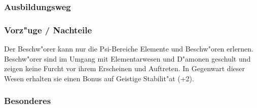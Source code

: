 \subsubsection{Ausbildungsweg}
\subsubsection{Vorz"uge / Nachteile}
\par Der Beschw"orer kann nur die Psi-Bereiche Elemente und
Beschw"oren erlernen. Beschw"orer sind im Umgang mit Elementarwesen
und D"amonen geschult und zeigen keine Furcht vor ihrem Erscheinen
und Auftreten. In Gegenwart dieser Wesen erhalten sie einen Bonus
auf Geistige Stabilit"at (+2).
\subsubsection{Besonderes}
